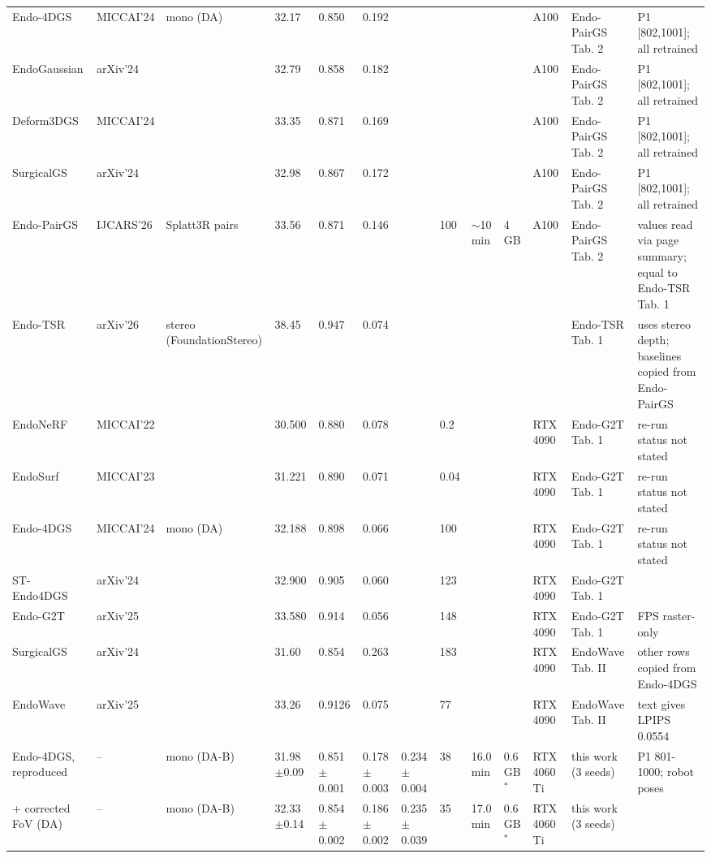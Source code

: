 \documentclass[9pt]{extarticle}
\begin{document}
\begin{longtable}{@{}p{4.2cm}p{1.15cm}p{2.1cm}p{2.2cm}p{2.0cm}p{2.0cm}p{1.35cm}p{0.85cm}p{1.15cm}p{1.0cm}p{1.35cm}p{2.3cm}p{3.6cm}@{}}
Endo-4DGS & MICCAI'24 & mono (DA) & 32.17 & 0.850 & 0.192 &  &  &  &  & A100 & Endo-PairGS Tab. 2 & P1 [802,1001]; all retrained \\
EndoGaussian & arXiv'24 &  & 32.79 & 0.858 & 0.182 &  &  &  &  & A100 & Endo-PairGS Tab. 2 & P1 [802,1001]; all retrained \\
Deform3DGS & MICCAI'24 &  & 33.35 & 0.871 & 0.169 &  &  &  &  & A100 & Endo-PairGS Tab. 2 & P1 [802,1001]; all retrained \\
SurgicalGS & arXiv'24 &  & 32.98 & 0.867 & 0.172 &  &  &  &  & A100 & Endo-PairGS Tab. 2 & P1 [802,1001]; all retrained \\
Endo-PairGS & IJCARS'26 & Splatt3R pairs & 33.56 & 0.871 & 0.146 &  & 100 & $\sim$10 min & 4 GB & A100 & Endo-PairGS Tab. 2 & values read via page summary; equal to Endo-TSR Tab. 1 \\
\cmidrule(l{0pt}r{0pt}){1-13}
Endo-TSR & arXiv'26 & stereo (FoundationStereo) & 38.45 & 0.947 & 0.074 &  &  &  &  &  & Endo-TSR Tab. 1 & uses stereo depth; baselines copied from Endo-PairGS \\
\cmidrule(l{0pt}r{0pt}){1-13}
EndoNeRF & MICCAI'22 &  & 30.500 & 0.880 & 0.078 &  & 0.2 &  &  & RTX 4090 & Endo-G2T Tab. 1 & re-run status not stated \\
EndoSurf & MICCAI'23 &  & 31.221 & 0.890 & 0.071 &  & 0.04 &  &  & RTX 4090 & Endo-G2T Tab. 1 & re-run status not stated \\
Endo-4DGS & MICCAI'24 & mono (DA) & 32.188 & 0.898 & 0.066 &  & 100 &  &  & RTX 4090 & Endo-G2T Tab. 1 & re-run status not stated \\
ST-Endo4DGS & arXiv'24 &  & 32.900 & 0.905 & 0.060 &  & 123 &  &  & RTX 4090 & Endo-G2T Tab. 1 &  \\
Endo-G2T & arXiv'25 &  & 33.580 & 0.914 & 0.056 &  & 148 &  &  & RTX 4090 & Endo-G2T Tab. 1 & FPS raster-only \\
\cmidrule(l{0pt}r{0pt}){1-13}
SurgicalGS & arXiv'24 &  & 31.60 & 0.854 & 0.263 &  & 183 &  &  & RTX 4090 & EndoWave Tab. II & other rows copied from Endo-4DGS \\
EndoWave & arXiv'25 &  & 33.26 & 0.9126 & 0.075 &  & 77 &  &  & RTX 4090 & EndoWave Tab. II & text gives LPIPS 0.0554 \\
\cmidrule(l{0pt}r{0pt}){1-13}
Endo-4DGS, reproduced & -- & mono (DA-B) & 31.98$\pm$0.09 & 0.851$\pm$0.001 & 0.178$\pm$0.003 & 0.234$\pm$0.004 & 38 & 16.0 min & 0.6 GB$^{*}$ & RTX 4060 Ti & this work (3 seeds) & P1 801-1000; robot poses \\
+ corrected FoV (DA) & -- & mono (DA-B) & 32.33$\pm$0.14 & 0.854$\pm$0.002 & 0.186$\pm$0.002 & 0.235$\pm$0.039 & 35 & 17.0 min & 0.6 GB$^{*}$ & RTX 4060 Ti & this work (3 seeds) &  \\

\end{longtable}
\end{document}
